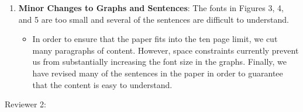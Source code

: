 \documentclass[11pt]{article}
\begin{document}
\begin{enumerate}
\begin{itemize}
    \end{itemize}

  \item {\bf Minor Changes to Graphs and Sentences}: The fonts in
    Figures 3, 4, and 5 are too small and several of the sentences are
    difficult to understand.

    \begin{itemize}

      \item In order to ensure that the paper fits into the ten page
        limit, we cut many paragraphs of content.  However, space
        constraints currently prevent us from substantially increasing
        the font size in the graphs.  Finally, we have revised many of
        the sentences in the paper in order to guarantee that the
        content is easy to understand.

    \end{itemize}

\end{enumerate}

\newpage

Reviewer 2: \vspace*{-.15in}
\renewcommand{\labelitemi}{$\rightarrow$}
\end{document}
